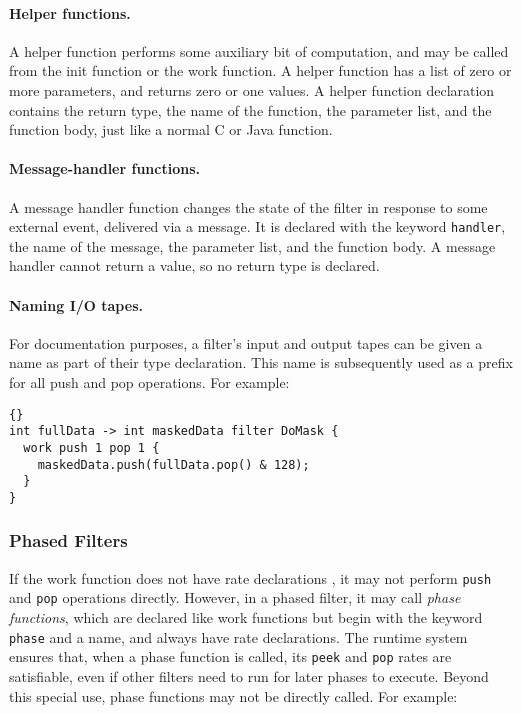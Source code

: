 \documentclass[11pt]{article}
\newcommand{\new}{\marginpar{\footnotesize \textbf{~~--~New~--}}}
\newcommand{\old}{\marginpar{\footnotesize \textbf{~~--~Old~--}}}
\begin{document}
\paragraph{Helper functions.}  A helper function performs some
auxiliary bit of computation, and may be called from the init function
or the work function.  A helper function has a list of zero or more
parameters, and returns zero or one values.  A helper function
declaration contains the return type, the name of the function, the
parameter list, and the function body, just like a normal C or Java
function.

\paragraph{Message-handler functions.}  A message handler function
changes the state of the filter in response to some external event,
delivered via a message.  It is declared with the keyword
\lstinline|handler|, the name of the message, the parameter list, and
the function body.  A message handler cannot return a value, so no
return type is declared.

\paragraph{Naming I/O tapes.}  For {\new} documentation 
purposes, a filter's input and output tapes can be given a name as
part of their type declaration.  This name is subsequently used as a
prefix for all push and pop operations.  For example:
\begin{lstlisting}{}
int fullData -> int maskedData filter DoMask {
  work push 1 pop 1 {
    maskedData.push(fullData.pop() & 128);
  }
}
\end{lstlisting}

\subsubsection{Phased Filters}  
\label{sec:phased-filter}

If the work function does not have rate declarations {\old}, it may not
perform \lstinline|push| and \lstinline|pop| operations directly.
However, in a phased filter, it may call \emph{phase functions}, which
are declared like work functions but begin with the keyword
\lstinline|phase| and a name, and always have rate declarations.  The
runtime system ensures that, when a phase function is called, its
\lstinline|peek| and \lstinline|pop| rates are satisfiable, even if
other filters need to run for later phases to execute.  Beyond this
special use, phase functions may not be directly called.  For example:
\end{document}
